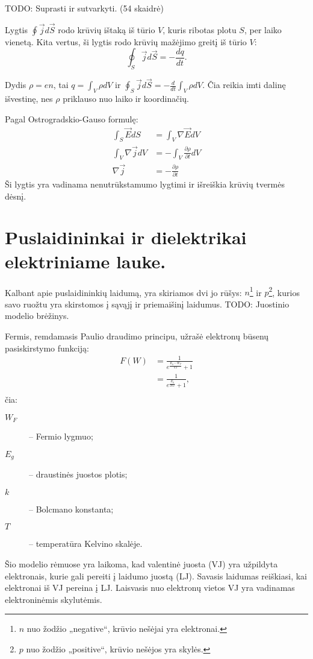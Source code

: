 TODO: Suprasti ir sutvarkyti. (54 skaidrė)

Lygtis $\oint \vec{j} d \vec{S}$ rodo krūvių ištaką iš tūrio $V$,
kuris ribotas plotu $S$, per laiko vienetą. Kita vertus, ši
lygtis rodo krūvių mažėjimo greitį iš tūrio $V$:
\begin{equation*}
  \oint _{S} \vec{j} d \vec{S} = - \frac{dq}{dt}.
\end{equation*}

Dydis $\rho = en$, tai $q = \int_{V} \rho dV$ ir
$\oint _{S} \vec{j} d\vec{S} = - \frac{d}{dt}\int_{V} \rho dV$.
Čia reikia imti dalinę išvestinę, nes $\rho$ priklauso nuo laiko
ir koordinačių.

Pagal Ostrogradskio-Gauso formulę:
\begin{align*}
  \int _{S} \vec{E} d S &= \int _{V} \nabla \vec{E}dV \\
  \int _{V}\nabla\vec{j}dV &= -\int _{V}\frac{\partial \rho}{\partial t}dV \\
  \nabla \vec{j} &= -\frac{\partial \rho}{\partial t}
\end{align*}
Ši lygtis yra vadinama nenutrūkstamumo lygtimi ir išreiškia krūvių
tvermės dėsnį.

\section{Puslaidininkai ir dielektrikai elektriniame lauke.}

Kalbant apie puslaidininkių laidumą, yra skiriamos dvi jo rūšys:
$n$\footnote{$n$ nuo žodžio „negative“, krūvio nešėjai yra elektronai.}
ir $p$\footnote{$p$ nuo žodžio „positive“, krūvio nešėjos yra skylės.},
kurios savo ruožtu yra skirstomos į sąvąjį ir priemaišinį
laidumus. TODO: Juostinio modelio brėžinys.

Fermis, remdamasis Paulio draudimo principu, užrašė elektronų
būsenų pasiskirstymo funkciją:
\begin{align}
  F(W)
  &= \frac{1}{e^{\frac{E_{g} - W_{F}}{kT}} + 1} \\
  &= \frac{1}{e^{\frac{E_{g}}{2kT}} + 1}, \label{eq:puslaidininkai_fw}\\
\end{align}
čia:
\begin{description}
  \item[$W_{F}$] – Fermio lygmuo;
  \item[$E_{g}$] – draustinės juostos plotis;
  \item[$k$] – Bolcmano konstanta;
  \item[$T$] – temperatūra Kelvino skalėje.
\end{description}
Šio modelio rėmuose yra laikoma, kad valentinė juosta (VJ) yra
užpildyta elektronais, kurie gali pereiti į laidumo juostą (LJ).
Savasis laidumas reiškiasi, kai elektronai iš VJ pereina į LJ.
Laisvasis nuo elektronų vietos VJ yra vadinamas elektroninėmis
skylutėmis.

